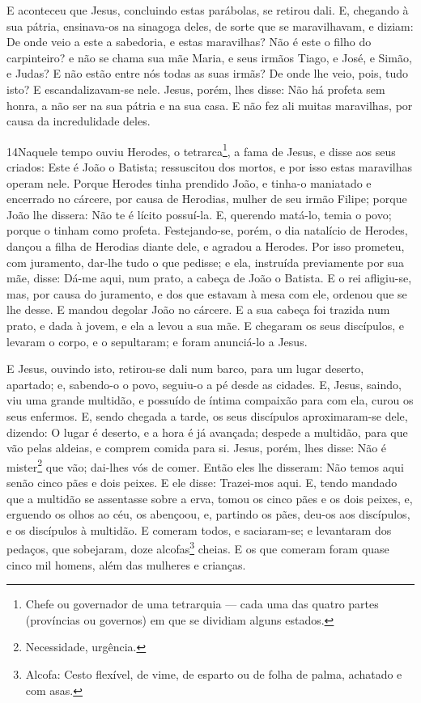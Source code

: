 E aconteceu que Jesus, concluindo estas parábolas, se retirou
dali. E, chegando à sua pátria, ensinava-os na sinagoga
deles, de sorte que se maravilhavam, e diziam: De onde veio a este a
sabedoria, e estas maravilhas? Não é este o filho do
carpinteiro? e não se chama sua mãe Maria, e seus irmãos Tiago, e
José, e Simão, e Judas? E não estão entre nós todas as suas
irmãs? De onde lhe veio, pois, tudo isto? E escandalizavam-se
nele. Jesus, porém, lhes disse: Não há profeta sem honra, a não ser
na sua pátria e na sua casa. E não fez ali muitas maravilhas,
por causa da incredulidade deles.

\medskip

\lettrine{14} Naquele tempo ouviu Herodes, o
tetrarca\footnote{Chefe ou governador de uma tetrarquia --- cada uma
das quatro partes (províncias ou governos) em que se dividiam alguns
estados.}, a fama de Jesus, e disse aos seus criados: Este é
João o Batista; ressuscitou dos mortos, e por isso estas maravilhas
operam nele. Porque Herodes tinha prendido João, e tinha-o
maniatado e encerrado no cárcere, por causa de Herodias, mulher de
seu irmão Filipe; porque João lhe dissera: Não te é lícito
possuí-la. E, querendo matá-lo, temia o povo; porque o tinham
como profeta. Festejando-se, porém, o dia natalício de Herodes,
dançou a filha de Herodias diante dele, e agradou a Herodes. Por
isso prometeu, com juramento, dar-lhe tudo o que pedisse; e ela,
instruída previamente por sua mãe, disse: Dá-me aqui, num prato, a
cabeça de João o Batista. E o rei afligiu-se, mas, por causa do
juramento, e dos que estavam à mesa com ele, ordenou que se lhe
desse. E mandou degolar João no cárcere. E a sua
cabeça foi trazida num prato, e dada à jovem, e ela a levou a sua
mãe. E chegaram os seus discípulos, e levaram o corpo, e o
sepultaram; e foram anunciá-lo a Jesus.

E Jesus, ouvindo isto, retirou-se dali num barco, para um lugar
deserto, apartado; e, sabendo-o o povo, seguiu-o a pé desde as
cidades. E, Jesus, saindo, viu uma grande multidão, e
possuído de íntima compaixão para com ela, curou os seus enfermos.
E, sendo chegada a tarde, os seus discípulos aproximaram-se
dele, dizendo: O lugar é deserto, e a hora é já avançada; despede a
multidão, para que vão pelas aldeias, e comprem comida para si.
Jesus, porém, lhes disse: Não é mister\footnote{Necessidade,
urgência.} que vão; dai-lhes vós de comer. Então eles lhe
disseram: Não temos aqui senão cinco pães e dois peixes. E
ele disse: Trazei-mos aqui. E, tendo mandado que a multidão
se assentasse sobre a erva, tomou os cinco pães e os dois peixes, e,
erguendo os olhos ao céu, os abençoou, e, partindo os pães, deu-os
aos discípulos, e os discípulos à multidão. E comeram todos,
e saciaram-se; e levantaram dos pedaços, que sobejaram, doze
alcofas\footnote{Alcofa: Cesto flexível, de vime, de esparto ou de
folha de palma, achatado e com asas.} cheias. E os que
comeram foram quase cinco mil homens, além das mulheres e crianças.

